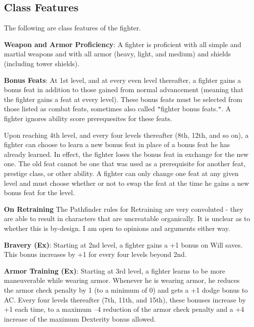 \subsection{Class Features}


The following are class features of the fighter.

\textbf{Weapon and Armor Proficiency}: A fighter is proficient with all simple and martial weapons 
    and with all armor (heavy, light, and medium) and shields (including tower shields).

\textbf{Bonus Feats}: At 1st level, and at every even level thereafter, a fighter gains a bonus
    feat in addition to those gained from normal advancement (meaning that the fighter gains
    a feat at every level). These bonus feats must be selected from those listed as combat feats,
    sometimes also called \texttt{{}"{}}fighter bonus feats.\texttt{{}"{}}. A fighter ignores
    ability score prerequesites for these feats.

Upon reaching 4th level, and every four levels thereafter (8th, 12th, and so on), a fighter can
choose to learn a new bonus feat in place of a bonus feat he has already learned. In effect, the
fighter loses the bonus feat in exchange for the new one. The old feat cannot be one that was used
as a prerequisite for another feat, prestige class, or other ability. A fighter can only change one
feat at any given level and must choose whether or not to swap the feat at the time he gains a new
bonus feat for the level.

\begin{formal}
 \textbf{On Retraining}
 The Pathfinder rules for Retraining are very convoluted - they are able to result in characters
 that are uncreatable organically. It is unclear as to whether this is by-design. I am open to
 opinions and arguments either way.
\end{formal}

\textbf{Bravery (Ex)}: Starting at 2nd level, a fighter gains a +1 bonus on Will saves. This bonus
increases by +1 for every four levels beyond 2nd.

\textbf{Armor Training (Ex)}: Starting at 3rd level, a fighter learns to be more maneuverable while
wearing armor. Whenever he is wearing armor, he reduces the armor check penalty by 1 (to a minimum of 0)
and gets a +1 dodge bonus to AC. Every four levels thereafter (7th, 11th, and 15th), these bonuses
increase by +1 each time, to a maximum --4 reduction of the armor check penalty and a +4 increase of the
maximum Dexterity bonus allowed.

